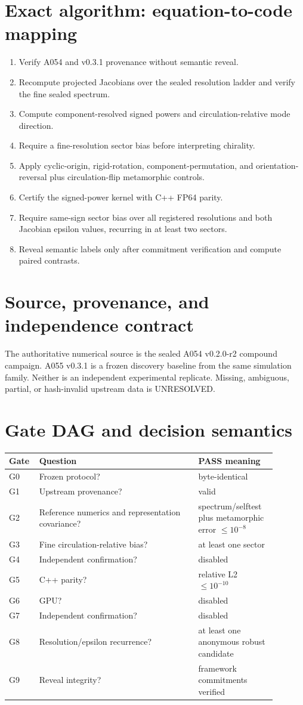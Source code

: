 \documentclass[11pt,a4paper]{article}
\begin{document}
\section{Exact algorithm: equation-to-code mapping}
\begin{enumerate}[label=S\arabic*.]\item Verify A054 and v0.3.1 provenance without semantic reveal.\item Recompute projected Jacobians over the sealed resolution ladder and verify the fine sealed spectrum.\item Compute component-resolved signed powers and circulation-relative mode direction.\item Require a fine-resolution sector bias before interpreting chirality.\item Apply cyclic-origin, rigid-rotation, component-permutation, and orientation-reversal plus circulation-flip metamorphic controls.\item Certify the signed-power kernel with C++ FP64 parity.\item Require same-sign sector bias over all registered resolutions and both Jacobian epsilon values, recurring in at least two sectors.\item Reveal semantic labels only after commitment verification and compute paired contrasts.\end{enumerate}
\section{Source, provenance, and independence contract}
The authoritative numerical source is the sealed A054 v0.2.0-r2 compound campaign. A055 v0.3.1 is a frozen discovery baseline from the same simulation family. Neither is an independent experimental replicate. Missing, ambiguous, partial, or hash-invalid upstream data is UNRESOLVED.
\section{Gate DAG and decision semantics}
\begin{longtable}{p{0.07\linewidth}p{0.55\linewidth}p{0.27\linewidth}}\toprule Gate&Question&PASS meaning\\\midrule G0&Frozen protocol?&byte-identical\\G1&Upstream provenance?&valid\\G2&Reference numerics and representation covariance?&spectrum/selftest plus metamorphic error $\le10^{-8}$\\G3&Fine circulation-relative bias?&at least one sector\\G4&Independent confirmation?&disabled\\G5&C++ parity?&relative L2 $\le10^{-10}$\\G6&GPU?&disabled\\G7&Independent confirmation?&disabled\\G8&Resolution/epsilon recurrence?&at least one anonymous robust candidate\\G9&Reveal integrity?&framework commitments verified\\\bottomrule\end{longtable}
\end{document}
